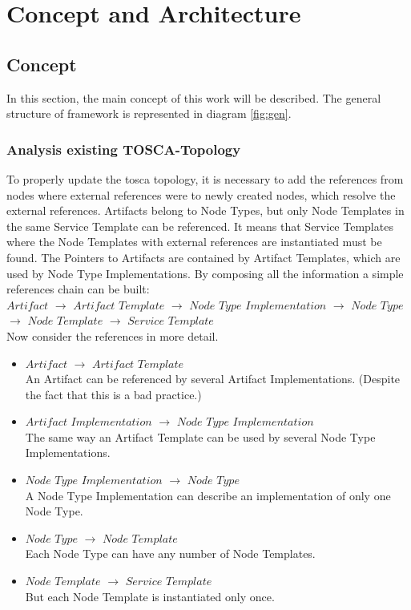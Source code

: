 
\chapter{Concept and Architecture}\label{chap:conarch}
\section{Concept}
In this section, the main concept of this work will be described.
The general structure of framework is represented in diagram \ref{fig:gen}.



\subsection{Analysis existing TOSCA-Topology}\label{subs:analyse}
To properly update the \gls{tosca} topology, it is necessary to add the references from nodes where external references were to newly created nodes, which resolve the external references. 
Artifacts belong to Node Types, but only Node Templates in the same Service Template can be referenced.  
It means that  Service Templates where the Node Templates with external references are instantiated must be found.
The Pointers to Artifacts are contained by Artifact Templates, which are used by Node Type Implementations.
By composing all the information a simple references chain can be built:\\
$Artifact$ $\rightarrow$ $Artifact$ $Template$ $\rightarrow$ $Node$ $Type$ $Implementation$ $\rightarrow$ $Node$ $Type$\\ $\rightarrow$ $Node$ $Template$ $\rightarrow$ $Service$ $Template$\\
Now consider the references in more detail. 
\begin{itemize}
	\item $Artifact$ $\rightarrow$ $Artifact$ $Template$\\
	An Artifact can be referenced by several Artifact Implementations. (Despite the fact that this is a bad practice.)
	\item  $Artifact$ $Implementation$ $\rightarrow$ $Node$ $Type$ $Implementation$ \\
	The same way an Artifact Template can be used by several Node Type Implementations.
	\item $Node$ $Type$ $Implementation$ $\rightarrow$ $Node$ $Type$ \\
	A Node Type Implementation can describe an implementation of only one Node Type.
	\item  $Node$ $Type$ $\rightarrow$ $Node$ $Template$\\
	Each Node Type can have any number of Node Templates.
	\item  $Node$ $Template$ $\rightarrow$ $Service$ $Template$\\
	But each Node Template is instantiated only once.
\end{itemize}
